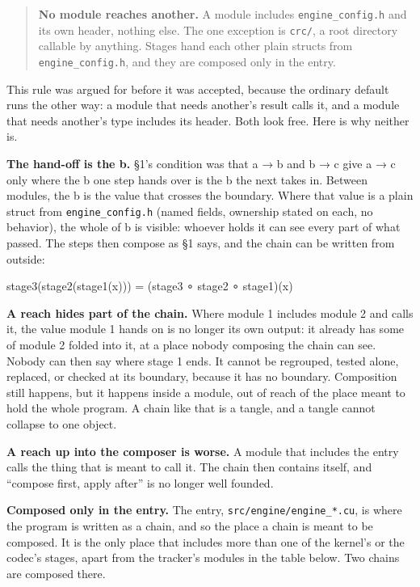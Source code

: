 \begin{quote}
\textbf{No module reaches another.} A module includes \texttt{engine\_\allowbreak{}config.\allowbreak{}h} and its own header, nothing else. The one exception is \texttt{crc/\allowbreak{}}, a root directory callable by anything. Stages hand each other plain structs from \texttt{engine\_\allowbreak{}config.\allowbreak{}h}, and they are composed only in the entry.

\end{quote}

This rule was argued for before it was accepted, because the ordinary default runs the other way: a module that needs another's result calls it, and a module that needs another's type includes its header. Both look free. Here is why neither is.

\textbf{The hand-off is the b.} §1's condition was that a → b and b → c give a → c only where the b one step hands over is the b the next takes in. Between modules, the b is the value that crosses the boundary. Where that value is a plain struct from \texttt{engine\_\allowbreak{}config.\allowbreak{}h} (named fields, ownership stated on each, no behavior), the whole of b is visible: whoever holds it can see every part of what passed. The steps then compose as §1 says, and the chain can be written from outside:

stage3(stage2(stage1(x)))  =  (stage3 ∘ stage2 ∘ stage1)(x)

\textbf{A reach hides part of the chain.} Where module 1 includes module 2 and calls it, the value module 1 hands on is no longer its own output: it already has some of module 2 folded into it, at a place nobody composing the chain can see. Nobody can then say where stage 1 ends. It cannot be regrouped, tested alone, replaced, or checked at its boundary, because it has no boundary. Composition still happens, but it happens inside a module, out of reach of the place meant to hold the whole program. A chain like that is a tangle, and a tangle cannot collapse to one object.

\textbf{A reach up into the composer is worse.} A module that includes the entry calls the thing that is meant to call it. The chain then contains itself, and “compose first, apply after” is no longer well founded.

\textbf{Composed only in the entry.} The entry, \texttt{src/\allowbreak{}engine/\allowbreak{}engine\_\allowbreak{}*.\allowbreak{}cu}, is where the program is written as a chain, and so the place a chain is meant to be composed. It is the only place that includes more than one of the kernel's or the codec's stages, apart from the tracker's modules in the table below. Two chains are composed there.

